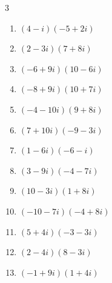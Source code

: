 \begin{multicols}{3}
\begin{enumerate}
  \item $\displaystyle (4-i)(-5+2i)$

        \phantom{$\displaystyle =-18+13i$}

  \item $\displaystyle (2-3i)(7+8i)$

        \phantom{$\displaystyle =38-5i$}

  \item $\displaystyle (-6+9i)(10-6i)$

        \phantom{$\displaystyle =-6+126i$}

  \item $\displaystyle (-8+9i)(10+7i)$

        \phantom{$\displaystyle =-143+34i$}

  \item $\displaystyle (-4-10i)(9+8i)$

        \phantom{$\displaystyle =44-122i$}

  \item $\displaystyle (7+10i)(-9-3i)$

        \phantom{$\displaystyle =-33-111i$}

  \item $\displaystyle (1-6i)(-6-i)$

        \phantom{$\displaystyle =-12+35i$}

\columnbreak %

  \item $\displaystyle (3-9i)(-4-7i)$

        \phantom{$\displaystyle =-75+15i$}

  \item $\displaystyle (10-3i)(1+8i)$

        \phantom{$\displaystyle =34+77i$}

  \item $\displaystyle (-10-7i)(-4+8i)$

        \phantom{$\displaystyle =96-52i$}

  \item $\displaystyle (5+4i)(-3-3i)$

        \phantom{$\displaystyle =-3-27i$}

  \item $\displaystyle (2-4i)(8-3i)$

        \phantom{$\displaystyle =4-38i$}

  \item $\displaystyle (-1+9i)(1+4i)$


\end{enumerate}
\end{multicols}
